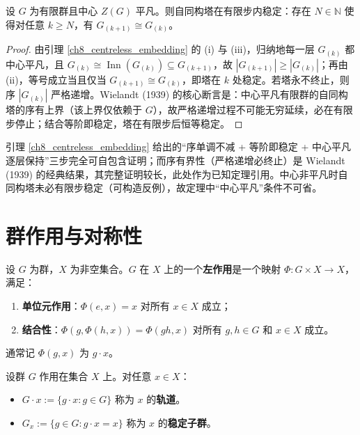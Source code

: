 \begin{theorem}\label{thm:finite_automorphism_tower}
设 $G$ 为有限群且中心 $Z(G)$ 平凡。则自同构塔在有限步内稳定：存在 $N \in \mathbb{N}$ 使得对任意 $k \ge N$，有 $G_{(k+1)} \cong G_{(k)}$。
\end{theorem}

\begin{proof}
由引理 \ref{ch8_centreless_embedding} 的 (i) 与 (iii)，归纳地每一层 $G_{(k)}$ 都中心平凡，且 $G_{(k)}\cong\operatorname{Inn}(G_{(k)})\subseteq G_{(k+1)}$，故 $|G_{(k+1)}|\ge|G_{(k)}|$；再由 (ii)，等号成立当且仅当 $G_{(k+1)}\cong G_{(k)}$，即塔在 $k$ 处稳定。若塔永不终止，则序 $|G_{(k)}|$ 严格递增。Wielandt (1939) 的核心断言是：中心平凡有限群的自同构塔的序有上界（该上界仅依赖于 $G$），故严格递增过程不可能无穷延续，必在有限步停止；结合等阶即稳定，塔在有限步后恒等稳定。
\end{proof}

\begin{remark}\label{rem:wielandt_boundary}
引理 \ref{ch8_centreless_embedding} 给出的“序单调不减 + 等阶即稳定 + 中心平凡逐层保持”三步完全可自包含证明；而序有界性（严格递增必终止）是 Wielandt (1939) 的经典结果，其完整证明较长，此处作为已知定理引用。中心非平凡时自同构塔未必有限步稳定（可构造反例），故定理中“中心平凡”条件不可省。
\end{remark}

\section{\texorpdfstring{群作用与对称性}{群作用与对称性}}

\begin{definition}[群作用]\label{def:group_action_gf}
设 $G$ 为群，$X$ 为非空集合。$G$ 在 $X$ 上的一个\textbf{左作用}是一个映射 $\Phi: G \times X \to X$，满足：
\begin{enumerate}[label=(\roman*)]
    \item \textbf{单位元作用}：$\Phi(e, x) = x$ 对所有 $x \in X$ 成立；
    \item \textbf{结合性}：$\Phi(g, \Phi(h, x)) = \Phi(gh, x)$ 对所有 $g,h \in G$ 和 $x \in X$ 成立。
\end{enumerate}
通常记 $\Phi(g, x)$ 为 $g \cdot x$。
\end{definition}

\begin{definition}[轨道与稳定子群]\label{def:orbit_stabilizer}
设群 $G$ 作用在集合 $X$ 上。对任意 $x \in X$：
\begin{itemize}
    \item $G \cdot x := \{g \cdot x : g \in G\}$ 称为 $x$ 的\textbf{轨道}。
    \item $G_x := \{g \in G : g \cdot x = x\}$ 称为 $x$ 的\textbf{稳定子群}。
\end{itemize}
\end{definition}

